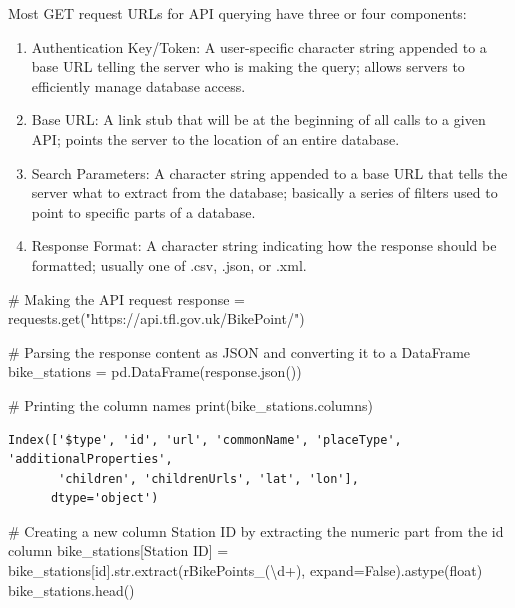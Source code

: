 \documentclass[
  letterpaper,
  DIV=11,
  numbers=noendperiod]{scrreprt}
\newenvironment{Shaded}{\begin{snugshade}}{\end{snugshade}}
\newcommand{\BuiltInTok}[1]{\textcolor[rgb]{0.00,0.23,0.31}{#1}}
\newcommand{\CommentTok}[1]{\textcolor[rgb]{0.37,0.37,0.37}{#1}}
\newcommand{\NormalTok}[1]{\textcolor[rgb]{0.00,0.23,0.31}{#1}}
\newcommand{\OperatorTok}[1]{\textcolor[rgb]{0.37,0.37,0.37}{#1}}
\newcommand{\StringTok}[1]{\textcolor[rgb]{0.13,0.47,0.30}{#1}}
\newcommand{\VariableTok}[1]{\textcolor[rgb]{0.07,0.07,0.07}{#1}}
\newcommand{\VerbatimStringTok}[1]{\textcolor[rgb]{0.13,0.47,0.30}{#1}}
\providecommand{\tightlist}{%
  \setlength{\itemsep}{0pt}\setlength{\parskip}{0pt}}\usepackage{longtable,booktabs,array}
\begin{document}
Most GET request URLs for API querying have three or four components:

\begin{enumerate}
\def\labelenumi{\arabic{enumi}.}
\tightlist
\item
  Authentication Key/Token: A user-specific character string appended to
  a base URL telling the server who is making the query; allows servers
  to efficiently manage database access.
\item
  Base URL: A link stub that will be at the beginning of all calls to a
  given API; points the server to the location of an entire database.
\item
  Search Parameters: A character string appended to a base URL that
  tells the server what to extract from the database; basically a series
  of filters used to point to specific parts of a database.
\item
  Response Format: A character string indicating how the response should
  be formatted; usually one of .csv, .json, or .xml.
\end{enumerate}

\begin{Shaded}
\begin{Highlighting}[]
\CommentTok{\# Making the API request}
\NormalTok{response }\OperatorTok{=}\NormalTok{ requests.get(}\StringTok{"https://api.tfl.gov.uk/BikePoint/"}\NormalTok{)}

\CommentTok{\# Parsing the response content as JSON and converting it to a DataFrame}
\NormalTok{bike\_stations }\OperatorTok{=}\NormalTok{ pd.DataFrame(response.json())}

\CommentTok{\# Printing the column names}
\BuiltInTok{print}\NormalTok{(bike\_stations.columns)}
\end{Highlighting}
\end{Shaded}

\begin{verbatim}
Index(['$type', 'id', 'url', 'commonName', 'placeType', 'additionalProperties',
       'children', 'childrenUrls', 'lat', 'lon'],
      dtype='object')
\end{verbatim}

\begin{Shaded}
\begin{Highlighting}[]
\CommentTok{\# Creating a new column \textquotesingle{}Station ID\textquotesingle{} by extracting the numeric part from the \textquotesingle{}id\textquotesingle{} column}
\NormalTok{bike\_stations[}\StringTok{\textquotesingle{}Station ID\textquotesingle{}}\NormalTok{] }\OperatorTok{=}\NormalTok{ bike\_stations[}\StringTok{\textquotesingle{}id\textquotesingle{}}\NormalTok{].}\BuiltInTok{str}\NormalTok{.extract(}\VerbatimStringTok{r\textquotesingle{}BikePoints\_(\textbackslash{}d+)\textquotesingle{}}\NormalTok{, expand}\OperatorTok{=}\VariableTok{False}\NormalTok{).astype(}\BuiltInTok{float}\NormalTok{)}
\NormalTok{bike\_stations.head()}
\end{Highlighting}
\end{Shaded}
\end{document}
